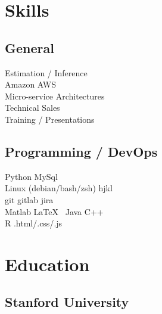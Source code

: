 \documentclass[letterpaper]{deedy-resume} %
\begin{document}
\begin{minipage}[t]{0.33\textwidth} %


\section{Skills}

\subsection{General}

Estimation / Inference\\
Amazon AWS\\
Micro-service Architectures\\
Technical Sales\\
Training / Presentations\\

\sectionspace %

\subsection{Programming / DevOps}

\textbullet{} Python \textbullet{} MySql\\
\textbullet{} Linux (debian/bash/zsh) \textbullet{} hjkl\\
\textbullet{} git \textbullet{} gitlab \textbullet{} jira\\
\textbullet{} Matlab \textbullet{} \LaTeX\ \textbullet{} Java \textbullet{} C++\\
\textbullet{} R \textbullet{} .html/.css/.js\\

\sectionspace %



\section{Education}

\subsection{Stanford University}


\end{minipage}
\end{document}
